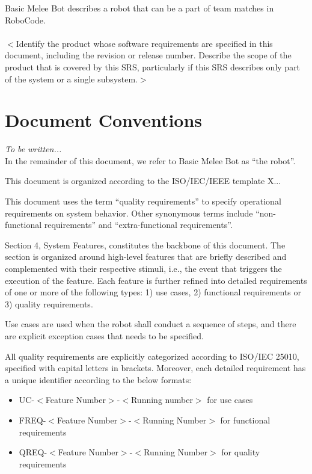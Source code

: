 \documentclass{scrreprt}
\begin{document}
Basic Melee Bot describes a robot that can be a part of team matches in RoboCode.\\\\

$<$Identify the product whose software requirements are specified in this 
document, including the revision or release number. Describe the scope of the 
product that is covered by this SRS, particularly if this SRS describes only 
part of the system or a single subsystem.$>$

\section{Document Conventions}
\textit{To be written...}\\

In the remainder of this document, we refer to Basic Melee Bot as ``the robot''.

This document is organized according to the ISO/IEC/IEEE template X...

This document uses the term ``quality requirements'' to specify operational requirements on system behavior. Other synonymous terms include ``non-functional requirements'' and ``extra-functional requirements''.

Section 4, System Features, constitutes the backbone of this document. The section is organized around high-level features that are briefly described and complemented with their respective stimuli, i.e., the event that triggers the execution of the feature. Each feature is further refined into detailed requirements of one or more of the following types: 1) use cases, 2) functional requirements or 3) quality requirements. 

Use cases are used when the robot shall conduct a sequence of steps, and there are explicit exception cases that needs to be specified.

All quality requirements are explicitly categorized according to ISO/IEC 25010, specified with capital letters in brackets. Moreover, each detailed requirement has a unique identifier according to the below formats: 

\begin{itemize}
\item UC-$<$Feature Number$>$-$<$Running number$>$ for use cases
\item FREQ-$<$Feature Number$>$-$<$Running Number$>$ for functional requirements
\item QREQ-$<$Feature Number$>$-$<$Running Number$>$ for quality requirements
\end{itemize}
\end{document}
